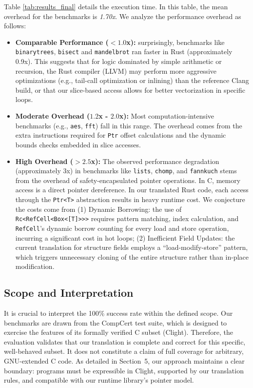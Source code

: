 \documentclass{llncs} %
\begin{document}
Table \ref{tab:results_final} details the execution time. In this table, the mean overhead for the benchmarks is \emph{1.70x}. We analyze the performance overhead as follows:
%
\begin{itemize}
    \item \textbf{Comparable Performance ($<1.0$x):} surprisingly, benchmarks like \allowbreak\texttt{bi\-narytrees}, \texttt{bisect} and \texttt{mandelbrot} ran faster in Rust (approximately 0.9x). This suggests that for logic dominated by simple arithmetic or recursion, the Rust compiler (LLVM) may perform more aggressive optimizations (e.g., tail-call optimization or inlining) than the reference Clang build, or that our slice-based access allows for better vectorization in specific loops.
    
    \item \textbf{Moderate Overhead ($1.2$x - $2.0$x):} Most computation-intensive benchmarks (e.g., \texttt{aes}, \texttt{fft}) fall in this range. The overhead comes from the extra instructions required for \texttt{Ptr} offset calculations and the dynamic bounds checks embedded in slice accesses.
    
    \item \textbf{High Overhead ($>2.5$x):} The observed performance degradation (approximately 3x) in benchmarks like \texttt{lists}, \texttt{chomp}, and \texttt{fannkuch} stems from the overhead of safety-encapsulated pointer operations. In C, memory access is a direct pointer dereference. In our translated Rust code, each access through the \texttt{Ptr<T>} abstraction results in heavy runtime cost. We conjecture the costs come from (1) Dynamic Borrowing: the use of \texttt{Rc<RefCell<Box<[T]{>}{>}{>}} requires pattern matching, index calculation, and \texttt{RefCell}'s dynamic borrow counting for every load and store operation, incurring a significant cost in hot loops; (2) Inefficient Field Updates: the current translation for structure fields employs a ``load-modify-store'' pattern, which triggers unnecessary cloning of the entire structure rather than in-place modification.
\end{itemize}

\subsection{Scope and Interpretation}
It is crucial to interpret the 100\% success rate within the defined scope. Our benchmarks are drawn from the CompCert test suite, which is designed to exercise the features of its formally verified C subset (Clight). Therefore, the evaluation validates that our translation is complete and correct for this specific, well-behaved subset. It does not constitute a claim of full coverage for arbitrary, GNU-extended C code. As detailed in Section~5, our approach maintains a clear boundary: programs must be expressible in Clight, supported by our translation rules, and compatible with our runtime library's pointer model.
\end{document}
